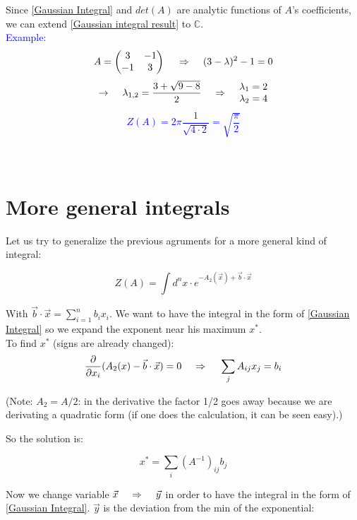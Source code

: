 \documentclass[12pt, english, a4paper]{book}
\newcommand{\Rarr}{\hspace{0.5cm} \mathbb{\Rightarrow} \hspace{0.5cm}}
\begin{document}
Since \eqref{Gaussian Integral} and $det(A)$ are analytic functions of $A$'s coefficients, we can extend \eqref{Gaussian integral result} to $\mathbb{C}$. \\


\textcolor{blue}
{ Example: $$ A = \left(
\begin{matrix}
3 & -1 \\
-1 & 3
\end{matrix}
\right) \Rarr (3-\lambda)^2 - 1 = 0 $$
$$ \mathbb{\rightarrow} \hspace{0.5cm} \lambda_{1,2} = \frac{3+\sqrt{9-8}}{2} \Rarr \begin{matrix}
\lambda_1 = 2 \\ \lambda_2 = 4
\end{matrix}
$$
$$ Z(A) = 2\pi \frac{1}{ \sqrt{4 \cdot 2} } = \sqrt{ \frac{ \pi } {2} } $$ \\ \\ }

\section{More general integrals}

Let us try to generalize the previous agruments for a more general kind of integral:

\begin{equation}\label{Gaussian Integral generalized}
Z(A) = \int d^{n}x \cdot e^{ -A_2(\vec{x}) + \vec{b} \cdot \vec{x} }
\end{equation}

With $ \vec{b} \cdot \vec{x} = \sum\limits_{i=1}^{n}b_i x_i $. We want to have the integral in the form of \eqref{Gaussian Integral} so we expand the exponent near his maximum $x^*$. \\
To find $x^*$ (signs are already changed):
$$ \frac{\partial}{\partial x_i} (A_2(x) - \vec{b} \cdot \vec{x}) = 0 \Rarr \sum\limits_{j} A_{ij} x_j = b_i $$

(Note: $A_2 = A/2$: in the derivative the factor 1/2 goes away because we are derivating a quadratic form (if one does the calculation, it can be seen easy).)

So the solution is:

$$ x^* = \sum\limits_{i} (A^{-1})_{ij} b_j $$

Now we change variable $ \vec{x} \Rarr \vec{y} $ in order to have the integral in the form of \eqref{Gaussian Integral}. $\vec{y}$ is the deviation from the min of the exponential:
\end{document}
